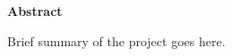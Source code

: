 
\begin{center}
    \Large \textbf{Abstract}
\end{center}

\begin{adjustwidth}{50pt}{50pt}

Brief summary of the project goes here.

\end{adjustwidth}